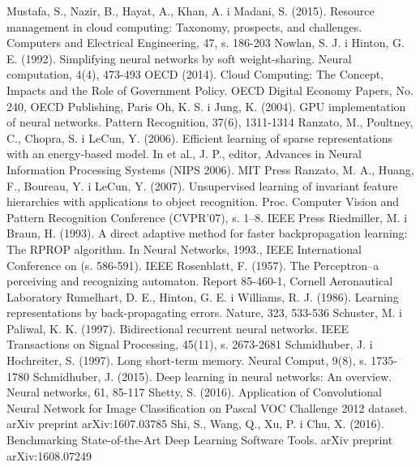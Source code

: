 \documentclass[12pt,a4paper,twoside]{article}
\begin{document}
\begin{thebibliography}{99}
 Mustafa, S., Nazir, B., Hayat, A., Khan, A. i Madani, S. (2015). Resource management in cloud computing: Taxonomy, prospects, and challenges. Computers and Electrical Engineering, 47, s. 186-203
 Nowlan, S. J. i Hinton, G. E. (1992). Simplifying neural networks by soft weight-sharing. Neural computation, 4(4), 473-493
 OECD (2014). Cloud Computing: The Concept, Impacts and the Role of Government Policy. OECD Digital Economy Papers, No. 240, OECD Publishing, Paris
 Oh, K. S. i Jung, K. (2004). GPU implementation of neural networks. Pattern Recognition, 37(6), 1311-1314
 Ranzato, M., Poultney, C., Chopra, S. i LeCun, Y. (2006). Efficient learning of sparse representations with an energy-based model. In et al., J. P., editor, Advances in Neural Information Processing Systems (NIPS 2006). MIT Press
 Ranzato, M. A., Huang, F., Boureau, Y. i LeCun, Y. (2007). Unsupervised learning of invariant feature hierarchies with applications to object recognition. Proc. Computer Vision and Pattern Recognition Conference (CVPR’07), s. 1–8. IEEE Press
 Riedmiller, M. i Braun, H. (1993). A direct adaptive method for faster backpropagation learning: The RPROP algorithm. In Neural Networks, 1993., IEEE International Conference on (s. 586-591). IEEE
 Rosenblatt, F. (1957). The Perceptron--a perceiving and recognizing automaton. Report 85-460-1, Cornell Aeronautical Laboratory
 Rumelhart, D. E., Hinton, G. E. i Williams, R. J. (1986). Learning representations by back-propagating errors. Nature, 323, 533-536
 Schuster, M. i Paliwal, K. K. (1997). Bidirectional recurrent neural networks. IEEE Transactions on Signal Processing, 45(11), s. 2673-2681
 Schmidhuber, J. i Hochreiter, S. (1997). Long short-term memory. Neural Comput, 9(8), s. 1735-1780
 Schmidhuber, J. (2015). Deep learning in neural networks: An overview. Neural networks, 61, 85-117
 Shetty, S. (2016).  Application of Convolutional Neural Network for Image Classification on Pascal VOC Challenge 2012 dataset. arXiv preprint arXiv:1607.03785
 Shi, S., Wang, Q., Xu, P. i Chu, X. (2016). Benchmarking State-of-the-Art Deep Learning Software Tools. arXiv preprint arXiv:1608.07249

\end{thebibliography}
\end{document}
